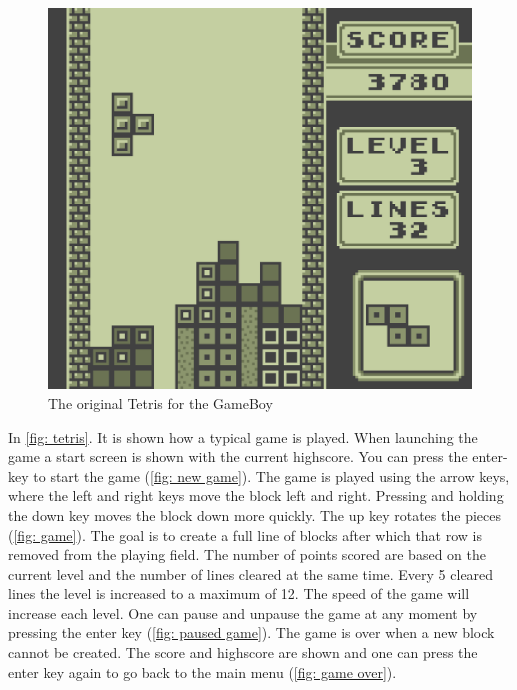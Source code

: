 \begin{figure}[H]
    \centering
    \includegraphics[width = 0.5 \textwidth]{Figures/day_5/gb_tetris.png}
    \caption{The original Tetris for the GameBoy}
    \label{fig: tetris gb}
\end{figure}

In \cref{fig: tetris}. It is shown how a typical game is played. When launching the game a start screen is shown with the current highscore. You can press the enter-key to start the game (\cref{fig: new game}). The game is played using the arrow keys, where the left and right keys move the block left and right. Pressing and holding the down key moves the block down more quickly. The up key rotates the pieces (\cref{fig: game}). The goal is to create a full line of blocks after which that row is removed from the playing field. The number of points scored are based on the current level and the number of lines cleared at the same time. Every 5 cleared lines the level is increased to a maximum of 12. The speed of the game will increase each level. One can pause and unpause the game at any moment by pressing the enter key (\cref{fig: paused game}). The game is over when a new block cannot be created. The score and highscore are shown and one can press the enter key again to go back to the main menu (\cref{fig: game over}). 

